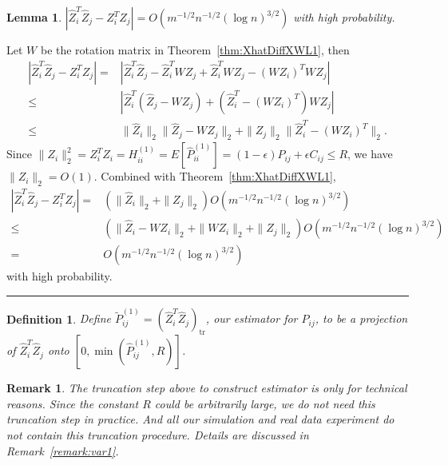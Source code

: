 \documentclass[a4paper]{article}
\newenvironment{proof}{{\bf Proof:  }}{\hfill\rule{2mm}{2mm}}
\newtheorem{lemma}[fact]{Lemma}
\newtheorem{definition}[fact]{Definition}
\newtheorem{remark}[fact]{Remark}
\renewcommand{\hat}{\widehat}
\begin{document}
\begin{lemma}
\label{lemma:1stMomentPhatDiffL1}
$\left|  \hat{Z}_i^T \hat{Z}_j - Z_i^T Z_j \right| = O(m^{-1/2} n^{-1/2} (\log n)^{3/2})$ with high probability.
\end{lemma}
\begin{proof}
Let $W$ be the rotation matrix in Theorem~\ref{thm:XhatDiffXWL1}, then
\begin{align*}
	\left|  \hat{Z}_i^T \hat{Z}_j - Z_i^T Z_j \right|
    = & \left| \hat{Z}_i^T \hat{Z}_j - \hat{Z}_i^T W Z_j + \hat{Z}_i^T W Z_j - (W Z_i)^T W Z_j \right| \\
    \le & \left| \hat{Z}_i^T (\hat{Z}_j - W Z_j) + (\hat{Z}_i^T - (W Z_i)^T) W Z_j \right| \\
    \le & \|\hat{Z}_i\|_2 \|\hat{Z}_j - W Z_j\|_2 + \|Z_j\|_2 \|\hat{Z}_i^T - (W Z_i)^T\|_2.
\end{align*}
Since $\|Z_i\|_2^2 = Z_i^T Z_i = H^{(1)}_{ii} =  E[\hat{P}^{(1)}_{ii}] = (1-\epsilon) P_{ij} + \epsilon C_{ij} \le R$, we have $\|Z_i\|_2 = O(1)$.
Combined with Theorem~\ref{thm:XhatDiffXWL1},
\begin{align*}
    \left|  \hat{Z}_i^T \hat{Z}_j - Z_i^T Z_j \right|
    = & (\|\hat{Z}_i\|_2 + \|Z_j\|_2) O(m^{-1/2} n^{-1/2} (\log n)^{3/2}) \\
    \le & (\|\hat{Z}_i - W Z_i\|_2 + \|W Z_i\|_2 + \|Z_j\|_2) O(m^{-1/2} n^{-1/2} (\log n)^{3/2}) \\
    = & O(m^{-1/2} n^{-1/2} (\log n)^{3/2})
\end{align*}
with high probability.
\end{proof}

\begin{definition}
\label{def:truncationMLE}
Define $\widetilde{P}_{ij}^{(1)} = (\hat{Z}_i^T \hat{Z}_j)_{\mathrm{tr}}$, our estimator for $P_{ij}$, to be a projection of $\hat{Z}_i^T \hat{Z}_j$ onto $[0, \min(\hat{P}_{ij}^{(1)}, R)]$.
\end{definition}

\begin{remark}
\label{remark:truncation}
The truncation step above to construct estimator is only for technical reasons. Since the constant $R$ could be arbitrarily large, we do not need this truncation step in practice. And all our simulation and real data experiment do not contain this truncation procedure. Details are discussed in Remark~\ref{remark:var1}.
\end{remark}
\end{document}
